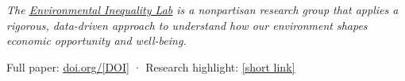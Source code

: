\documentclass[
  11pt,
]{article}
\begin{document}
\begin{center}{\color{muted}\itshape\fontsize{9.5pt}{14pt}\selectfont
The \href{https://www.environmental-inequality-lab.org/}{\color{cite}\underline{Environmental Inequality Lab}} is a nonpartisan research group that applies a rigorous, data-driven approach to understand how our environment shapes economic opportunity and well-being.\par}
\end{center}

\vspace{10pt}

\begin{center}{\color{faint}\fontsize{8pt}{11pt}\selectfont
Full paper: \href{https://doi.org/[DOI]}{\color{faint}\underline{doi.org/[DOI]}} \quad·\quad
Research highlight: \href{[URL]}{\color{faint}\underline{[short link]}}\par}
\end{center}
\end{document}
